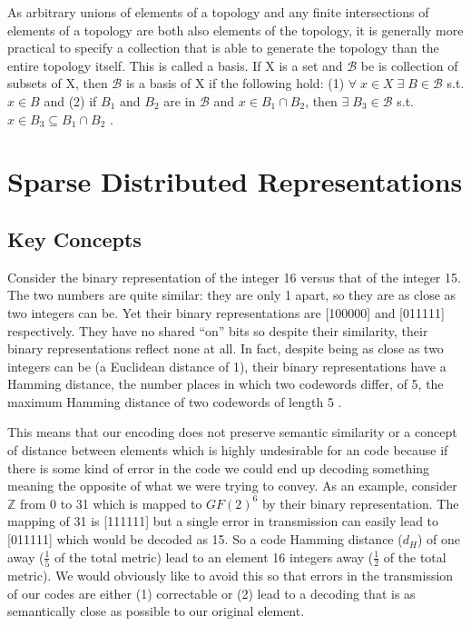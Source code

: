 \documentclass[fleqn,notitlepage,minimal]{article}
\begin{document}
	As arbitrary unions of elements of a topology and any finite intersections of elements of a topology are both also elements of the topology, it is generally more practical to specify a collection that is able to generate the topology than the entire topology itself. This is called a basis. If X is a set and $\mathcal{B}$ be is collection of subsets of X, then $\mathcal{B}$ is a basis of X if the following hold: (1) $\forall \; x \in X \; \exists \; B \in \mathcal{B}$ s.t. $x \in B$ and (2) if $B_{1}$ and $B_{2}$ are in $\mathcal{B}$ and $x \in B_{1} \cap B_{2}$, then $\exists \; B_{3} \in \mathcal{B}$ s.t. $x \in B_{3} \subseteq B_{1} \cap B_{2}$ \cite{Adams}.
	
	\section{Sparse Distributed Representations}
	
	\subsection{Key Concepts}
	
	Consider the binary representation of the integer 16 versus that of the integer 15. The two numbers are quite similar: they are only 1 apart, so they are as close as two integers can be. Yet their binary representations are [100000] and [011111] respectively. They have no shared ``on'' bits so despite their similarity, their binary representations reflect none at all. In fact, despite being as close as two integers can be (a Euclidean distance of 1), their binary representations have a Hamming distance, the number places in which two codewords differ, of 5, the maximum Hamming distance of two codewords of length 5 \cite{Adams}. 
	
	This means that our encoding does not preserve semantic similarity or a concept of distance between elements which is highly undesirable for an code because if there is some kind of error in the code we could end up decoding something meaning the opposite of what we were trying to convey. As an example, consider $\mathbb{Z}$ from 0 to 31 which is mapped to $GF(2)^{6}$ by their binary representation. The mapping of 31 is [111111] but a single error in transmission can easily lead to [011111] which would be decoded as 15. So a code Hamming distance ($d_{H}$) of one away ($\frac{1}{5}$ of the total metric) lead to an element 16 integers away ($\frac{1}{2}$ of the total metric). We would obviously like to avoid this so that errors in the transmission of our codes are either (1) correctable or (2) lead to a decoding that is as semantically close as possible to our original element.
	
\end{document}

